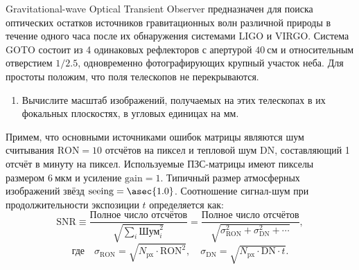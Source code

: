 Gravitational-wave Optical Transient Observer предназначен для поиска
оптических остатков источников гравитационных волн различной природы
в течение одного часа после их обнаружения системами LIGO и VIRGO.
Система GOTO состоит из 4 одинаковых рефлекторов с апертурой
$\qty{40}{см}$ и относительным отверстием $1/2.5$, одновременно
фотографирующих крупный участок неба. Для простоты положим, что поля
телескопов не перекрываются.

\begin{enumerate}
  \item Вычислите масштаб изображений, получаемых на этих телескопах
        в их фокальных плоскостях, в угловых единицах на мм.
\end{enumerate}

Примем, что основными источниками ошибок матрицы являются шум считывания
$\mathrm{RON} = 10$ отсчётов на пиксел и тепловой шум $\mathrm{DN}$,
составляющий 1 отсчёт в минуту на пиксел. Используемые ПЗС-матрицы имеют
пикселы размером $\qty{6}{мкм}$ и усиление $\mathrm{gain} = 1$. Типичный размер
атмосферных изображений звёзд $\mathrm{seeing} = \asec{1.0}$. Соотношение
сигнал-шум при продолжительности экспозиции $t$ определяется как:
\[
  \mathrm{SNR} \equiv
  \frac{\text{Полное число отсчётов}}{\sqrt{\sum_i \text{Шум}_i^2}}
  = \frac{\text{Полное число отсчётов}}
         {\sqrt{\sigma_{\mathrm{RON}}^2 + \sigma_{\mathrm{DN}}^2 + \cdots}},
\]
\[
  \text{где}\quad
  \sigma_{\mathrm{RON}} = \sqrt{N_{\mathrm{px}} \cdot \mathrm{RON}^2},\quad
  \sigma_{\mathrm{DN}} = \sqrt{N_{\mathrm{px}} \cdot \mathrm{DN} \cdot t}.
\]
